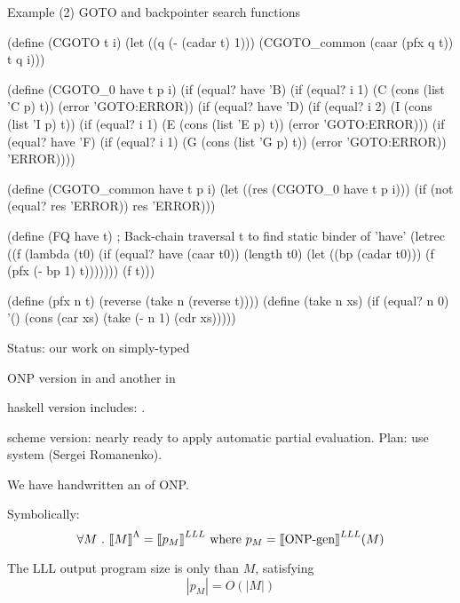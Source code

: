 \documentclass[12pt,fleqn,landscape]{article}
\begin{document}
\begin{slide}{Example (2)   GOTO and backpointer search functions}

\bp
(define (CGOTO t i) (let ((q (- (cadar t) 1))) (CGOTO_common (caar (pfx q t)) t q i)))

(define (CGOTO_0 have t p i)
    (if (equal? have 'B)
      (if (equal? i 1) (C (cons (list 'C p) t)) (error 'GOTO:ERROR))
      (if (equal? have 'D)
        (if (equal? i 2)
          (I (cons (list 'I p) t))
          (if (equal? i 1) (E (cons (list 'E p) t)) (error 'GOTO:ERROR)))
        (if (equal? have 'F)
          (if (equal? i 1) (G (cons (list 'G p) t)) (error 'GOTO:ERROR))
          'ERROR))))
            
  (define (CGOTO_common have t p i)
    (let ((res (CGOTO_0 have t p i))) (if (not (equal? res 'ERROR)) res 'ERROR)))
    
  (define (FQ have t)   ;  Back-chain traversal t to find static binder of 'have'
    (letrec ((f
              (lambda (t0)
                (if (equal? have (caar t0))
                  (length t0)
                  (let ((bp (cadar t0))) (f (pfx (- bp 1) t)))))))
      (f t)))
      
  (define (pfx n t) (reverse (take n (reverse t))))
  (define (take n xs) (if (equal? n 0) '() (cons (car xs) (take (- n 1) (cdr xs)))))
 
\ep
\end{slide}


\begin{slide}{Status: our work on simply-typed \lc }

\be

\item ONP version in   and another in 
\vair

\item {\sc haskell} version includes: .
\vair

\item {\sc scheme} version: nearly ready to apply automatic partial evaluation. Plan: use   system (Sergei Romanenko).
\vair

\item We have   handwritten an  of ONP. 

Symbolically:
$$
\forall M \ .\ \mbox{$\lbrack\hspace{-0.3ex}\lbrack$} M\mbox{$\rbrack\hspace{-0.3ex}\rbrack$}^\Lambda =  \mbox{$\lbrack\hspace{-0.3ex}\lbrack$} p_M \mbox{$\rbrack\hspace{-0.3ex}\rbrack$}^{LLL} 
\mbox{\ where\ }
p_M = \mbox{$\lbrack\hspace{-0.3ex}\lbrack$} \mbox{ONP-gen} \mbox{$\rbrack\hspace{-0.3ex}\rbrack$}^{LLL} (M)
$$
\vair

\item The LLL output program size  is only  than $M$, satisfying 
$$|p_M| = O(|M|)$$

\ee

\end{slide}
\end{document}
